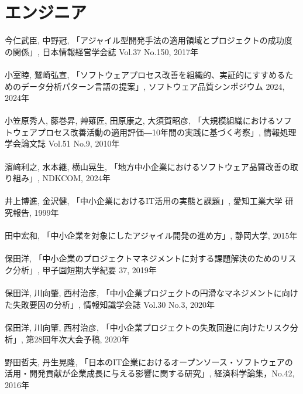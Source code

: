 \section*{エンジニア}
今仁武臣, 中野冠, 「アジャイル型開発手法の適用領域とプロジェクトの成功度の関係」, 日本情報経営学会誌 Vol.37 No.150, 2017年
\\\\
小室睦, 鷲崎弘宣, 「ソフトウェアプロセス改善を組織的、実証的にすすめるためのデータ分析パターン言語の提案」, ソフトウェア品質シンポジウム 2024, 2024年
\\\\
小笠原秀人, 藤巻昇, 艸薙匠, 田原康之, 大須賀昭彦, 「大規模組織におけるソフトウェアプロセス改善活動の適用評価―10年間の実践に基づく考察」, 情報処理学会論文誌 Vol.51 No.9, 2010年
\\\\
濱﨑利之, 水本継, 横山晃生, 「地方中小企業におけるソフトウェア品質改善の取り組み」, NDKCOM, 2024年
\\\\
井上博進, 金沢健, 「中小企業におけるIT活用の実態と課題」, 愛知工業大学 研究報告, 1999年
\\\\
田中宏和, 「中小企業を対象にしたアジャイル開発の進め方」, 静岡大学, 2015年
\\\\
保田洋, 「中小企業のプロジェクトマネジメントに対する課題解決のためのリスク分析」, 甲子園短期大学紀要 37, 2019年
\\\\
保田洋, 川向肇, 西村治彦, 「中小企業プロジェクトの円滑なマネジメントに向けた失敗要因の分析」, 情報知識学会誌 Vol.30 No.3, 2020年
\\\\
保田洋, 川向肇, 西村治彦, 「中小企業プロジェクトの失敗回避に向けたリスク分析」, 第28回年次大会予稿, 2020年
\\\\
野田哲夫, 丹生晃隆, 「日本のIT企業におけるオープンソース・ソフトウェアの活用・開発貢献が企業成長に与える影響に関する研究」, 経済科学論集，No.42, 2016年
